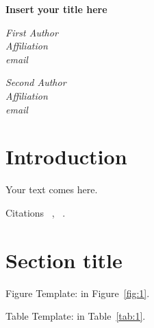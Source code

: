 \documentclass[12pt]{article}
\def\Title#1{\begin{center} {\Large {\bf #1} } \end{center}}
\begin{document}
\Title{Insert your title here}

\bigskip\bigskip


\begin{raggedright}

{\it First Author \\
Affiliation \\
email}
\bigskip\bigskip
\end{raggedright}

\begin{raggedright}

{\it Second Author \\
Affiliation \\
email}
\bigskip\bigskip
\end{raggedright}


\begin{abstract}
Insert your abstract here.
\end{abstract}


\section{Introduction}\label{intro}

Your text comes here.

Citations ~\cite{RefJ}, ~\cite{RefB}.

\section{Section title}\label{sec:1}


Figure Template: in Figure~\ref{fig:1}.




Table Template: in Table~\ref{tab:1}.
\end{document}
